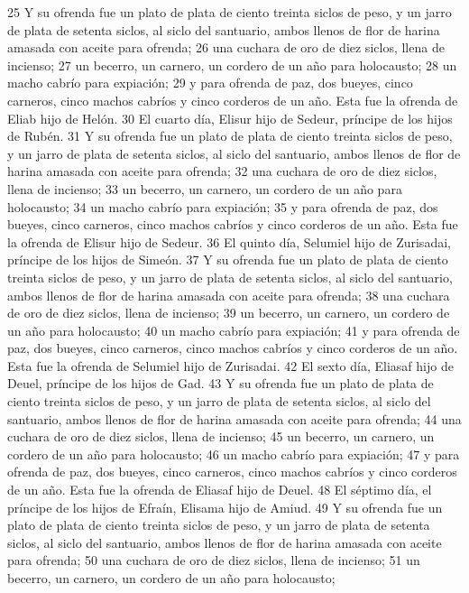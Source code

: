 25 Y su ofrenda fue un plato de plata de ciento treinta siclos de peso,  y un jarro de plata de setenta siclos, al siclo del santuario, ambos llenos de flor de harina amasada con aceite para ofrenda;
26 una cuchara de oro de diez siclos,  llena de incienso;
27 un becerro, un carnero, un cordero de un año para holocausto;
28 un macho cabrío para expiación; 
29 y para ofrenda de paz, dos bueyes, cinco carneros, cinco machos cabríos y cinco corderos de un año. Esta fue la ofrenda de Eliab hijo de Helón.
30 El cuarto día, Elisur hijo de Sedeur, príncipe de los hijos de Rubén.
31 Y su ofrenda fue un plato de plata de ciento treinta siclos de peso,  y un jarro de plata de setenta siclos, al siclo del santuario, ambos llenos de flor de harina amasada con aceite para ofrenda;
32 una cuchara de oro de diez siclos,  llena de incienso;
33 un becerro, un carnero, un cordero de un año para holocausto;
34 un macho cabrío para expiación;
35 y para ofrenda de paz, dos bueyes, cinco carneros, cinco machos cabríos y cinco corderos de un año. Esta fue la ofrenda de Elisur hijo de Sedeur.
36 El quinto día, Selumiel hijo de Zurisadai, príncipe de los hijos de Simeón.
37 Y su ofrenda fue un plato de plata de ciento treinta siclos de peso,  y un jarro de plata de setenta siclos, al siclo del santuario, ambos llenos de flor de harina amasada con aceite para ofrenda;
38 una cuchara de oro de diez siclos,  llena de incienso;
39 un becerro, un carnero, un cordero de un año para holocausto;
40 un macho cabrío para expiación;
41 y para ofrenda de paz, dos bueyes, cinco carneros, cinco machos cabríos y cinco corderos de un año. Esta fue la ofrenda de Selumiel hijo de Zurisadai.
42 El sexto día, Eliasaf hijo de Deuel, príncipe de los hijos de Gad.
43 Y su ofrenda fue un plato de plata de ciento treinta siclos de peso,  y un jarro de plata de setenta siclos, al siclo del santuario, ambos llenos de flor de harina amasada con aceite para ofrenda;
44 una cuchara de oro de diez siclos,  llena de incienso;
45 un becerro, un carnero, un cordero de un año para holocausto;
46 un macho cabrío para expiación;
47 y para ofrenda de paz, dos bueyes, cinco carneros, cinco machos cabríos y cinco corderos de un año. Esta fue la ofrenda de Eliasaf hijo de Deuel.
48 El séptimo día, el príncipe de los hijos de Efraín, Elisama hijo de Amiud.
49 Y su ofrenda fue un plato de plata de ciento treinta siclos de peso,  y un jarro de plata de setenta siclos, al siclo del santuario, ambos llenos de flor de harina amasada con aceite para ofrenda;
50 una cuchara de oro de diez siclos,  llena de incienso;
51 un becerro, un carnero, un cordero de un año para holocausto;
